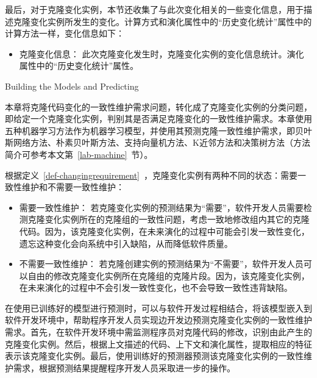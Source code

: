 最后，对于克隆变化实例，本节还收集了与此次变化相关的一些变化信息，用于描述克隆变化实例所发生的变化。计算方式和演化属性中的“历史变化统计”属性中的计算方法一样，变化信息如下：

\begin {itemize}
\item
克隆变化信息：
此次克隆变化发生时，克隆变化实例的变化信息统计。演化属性中的“历史变化统计”属性。
\end {itemize}


{Building the Models and Predicting} 

本章将克隆代码变化的一致性维护需求问题，转化成了克隆变化实例的分类问题，即给定一个克隆变化实例，判别其是否满足克隆变化的一致性维护需求。本章使用五种机器学习方法作为机器学习模型，并使用其预测克隆一致性维护需求，即贝叶斯网络方法、朴素贝叶斯方法、支持向量机方法、K近邻方法和决策树方法（方法简介可参考本文第~\ref{lab-machine}~节）。

根据定义~\ref{def-changingrequirement}~，克隆变化实例有两种不同的状态：需要一致性维护和不需要一致性维护：
\begin{itemize}
\item 
需要一致性维护：
若克隆变化实例的预测结果为“需要”，软件开发人员需要检测克隆变化实例所在的克隆组的一致性问题，考虑一致地修改组内其它的克隆代码。因为，该克隆变化实例，在未来演化的过程中可能会引发一致性变化，遗忘这种变化会向系统中引入缺陷，从而降低软件质量。
\item
不需要一致性维护：
若克隆创建实例的预测结果为“不需要”，软件开发人员可以自由的修改克隆变化实例所在克隆组的克隆片段。因为，该克隆变化实例，在未来演化的过程中不会引发一致性变化，也不会导致一致性违背缺陷。
\end{itemize}

在使用已训练好的模型进行预测时，可以与软件开发过程相结合，将该模型嵌入到软件开发环境中，帮助程序开发人员实现边开发边预测克隆变化实例的一致性维护需求。首先，在软件开发环境中需监测程序员对克隆代码的修改，识别由此产生的克隆变化实例。然后，根据上文描述的代码、上下文和演化属性，提取相应的特征表示该克隆变化实例。最后，使用训练好的预测器预测该克隆变化实例的一致性维护需求，根据预测结果提醒程序开发人员采取进一步的操作。

